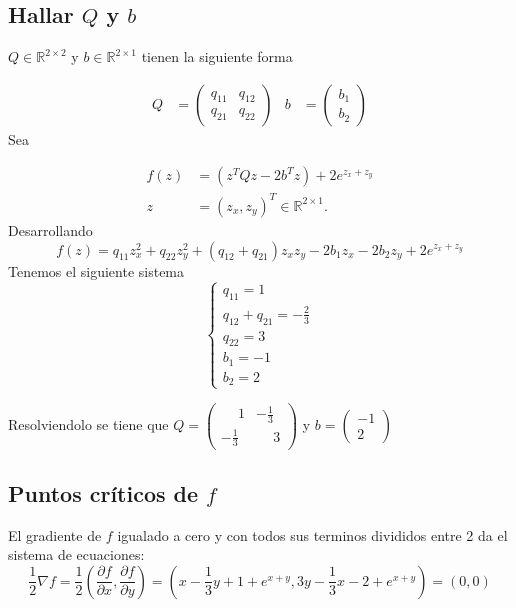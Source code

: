 \documentclass{endm}
\begin{document}
\subsection{Hallar $Q$ y $b$}
$Q \in \mathbb{R}^{2\times2}$ y $b \in \mathbb{R}^{2\times1}$ tienen la siguiente forma

\begin{align}
    Q &= \begin{pmatrix} q_{11} & q_{12} \\ q_{21} & q_{22} \end{pmatrix} & b &= \begin{pmatrix} b_1 \\ b_2 \end{pmatrix}
\end{align}
Sea

\begin{align} 
    f(z) &= (z^{T}Qz - 2b^{T}z) + 2e^{z_x+z_y} \\
    z &= (z_x,z_y)^T \in \mathbb{R}^{2\times1}.
\end{align}
Desarrollando
\begin{equation}
    f(z) = q_{11}z_x^2 + q_{22}z_y^2 + (q_{12} + q_{21})z_x z_y - 2b_1 z_x - 2b_2z_y + 2e^{z_x+z_y}
\end{equation}
Tenemos el siguiente sistema
\begin{equation}
\begin{cases}
q_{11} = 1 \\
q_{12} + q_{21} = -\frac{2}{3} \\
q_{22} = 3 \\
b_1 = -1 \\
b_2 = 2
\end{cases}
\end{equation}

Resolviendolo se tiene que
$Q =  \begin{pmatrix} \phantom{-}1 & -\frac{1}{3} \\ -\frac{1}{3} & \phantom{-}3\end{pmatrix} $
y
$b = \begin{pmatrix} -1\\ 2 \end{pmatrix}$

\subsection{Puntos críticos de $f$}
El gradiente de $f$ igualado a cero y con todos sus terminos divididos entre 2 da el sistema de ecuaciones:
\begin{equation}
\frac{1}{2}\nabla f = \frac{1}{2}\left( \frac{\partial f}{\partial x}, \frac{\partial f}{\partial y} \right)
=
\left( x - \frac{1}{3}y + 1 + e^{x+y}, 3y - \frac{1}{3}x - 2 + e^{x+y} \right) = (0,0)
\end{equation}
\end{document}
